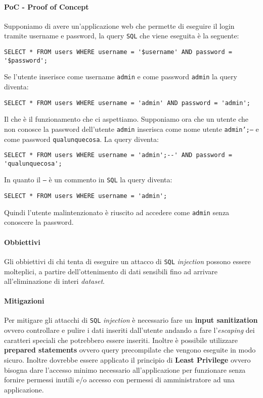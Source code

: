             \paragraph{PoC - Proof of Concept} Supponiamo di avere un'applicazione web che permette di eseguire il login tramite username e password, la query \texttt{SQL} che viene eseguita è la seguente: 
            \begin{lstlisting}
SELECT * FROM users WHERE username = '$username' AND password = '$password';\end{lstlisting}
            Se l'utente inserisce come username \texttt{admin} e come password \texttt{admin} la query diventa:
            \begin{lstlisting}
SELECT * FROM users WHERE username = 'admin' AND password = 'admin';\end{lstlisting}
            Il che è il funzionamento che ci aspettiamo. Supponiamo ora che un utente che non conosce la password dell'utente \texttt{admin} inserisca come nome utente \texttt{admin';--} e come password \texttt{qualunquecosa}. La query diventa:
            \begin{lstlisting}
SELECT * FROM users WHERE username = 'admin';--' AND password = 'qualunquecosa';\end{lstlisting}
            In quanto il \texttt{--} è un commento in \texttt{SQL} la query diventa:
            \begin{lstlisting}
SELECT * FROM users WHERE username = 'admin';\end{lstlisting}
            Quindi l'utente malintenzionato è riuscito ad accedere come \texttt{admin} senza conoscere la password. 
            \paragraph{Obbiettivi} Gli obbiettivi di chi tenta di eseguire un attacco di \texttt{SQL} \textit{injection} possono essere molteplici, a partire dell'ottenimento di dati sensibili fino ad arrivare all'eliminazione di interi \textit{dataset}.
            \paragraph{Mitigazioni} Per mitigare gli attacchi di \texttt{SQL} \textit{injection} è necessario fare un \textbf{input sanitization} ovvero controllare e pulire i dati inseriti dall'utente andando a fare l'\textit{escaping} dei caratteri speciali che potrebbero essere inseriti. Inoltre è possibile utilizzare \textbf{prepared statements} ovvero query precompilate che vengono eseguite in modo sicuro. Inoltre dovrebbe essere applicato il principio di \textbf{Least Privilege} ovvero bisogna dare l'accesso minimo necessario all'applicazione per funzionare senza fornire permessi inutili e/o accesso con permessi di amministratore ad una applicazione.
